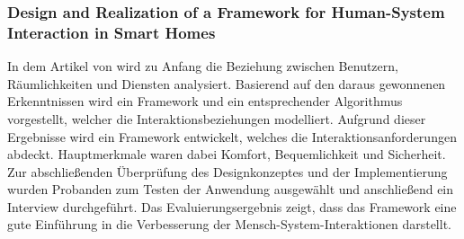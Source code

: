         \subsubsection*{Design and Realization of a Framework for Human-System Interaction in Smart Homes}
            In dem Artikel von \cite{Wu2012} wird zu Anfang die Beziehung zwischen Benutzern, Räumlichkeiten und 
            Diensten analysiert. Basierend auf den daraus gewonnenen Erkenntnissen wird ein Framework und ein 
            entsprechender Algorithmus vorgestellt, welcher die Interaktionsbeziehungen modelliert. Aufgrund dieser   
            Ergebnisse wird ein Framework entwickelt, welches die Interaktionsanforderungen abdeckt. Hauptmerkmale 
            waren dabei Komfort, Bequemlichkeit und Sicherheit. Zur abschließenden Überprüfung des Designkonzeptes und 
            der Implementierung wurden Probanden zum Testen der Anwendung ausgewählt und anschließend ein Interview 
            durchgeführt. Das Evaluierungsergebnis zeigt, dass das Framework eine gute Einführung in die Verbesserung 
            der Mensch-System-Interaktionen darstellt. 


